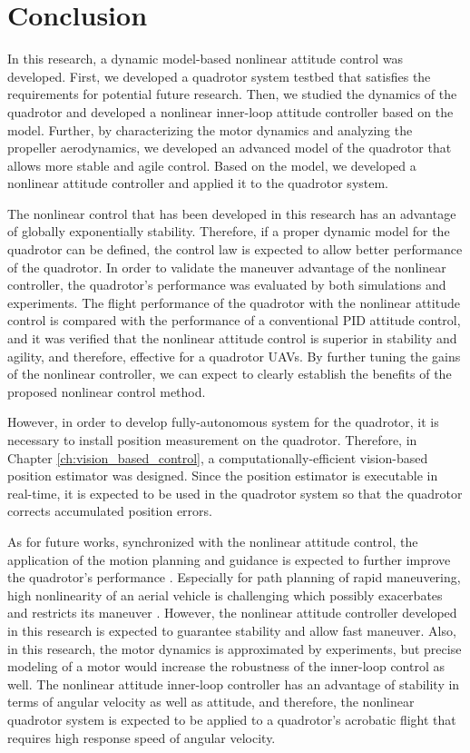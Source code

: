 \chapter{Conclusion}
\label{ch:conclusion}

In this research, a dynamic model-based nonlinear attitude control was developed. First, we developed a quadrotor system testbed that satisfies the requirements for potential future research. Then, we studied the dynamics of the quadrotor and developed a nonlinear inner-loop attitude controller based on the model. Further, by characterizing the motor dynamics and analyzing the propeller aerodynamics, we developed an advanced model of the quadrotor that allows more stable and agile control. Based on the model, we developed a nonlinear attitude controller and applied it to the quadrotor system.
 
The nonlinear control that has been developed in this research has an advantage of globally exponentially stability. Therefore, if a proper dynamic model for the quadrotor can be defined, the control law is expected to allow better performance of the quadrotor. In order to validate the maneuver advantage of the nonlinear controller, the quadrotor's performance was evaluated by both simulations and experiments. The flight performance of the quadrotor with the nonlinear attitude control is compared with the performance of a conventional PID attitude control, and it was verified that the nonlinear attitude control is superior in stability and agility, and therefore, effective for a quadrotor UAVs. By further tuning the gains of the nonlinear controller, we can expect to clearly establish the benefits of the proposed nonlinear control method.

However, in order to develop fully-autonomous system for the quadrotor, it is necessary to install position measurement on the quadrotor. Therefore, in Chapter \ref{ch:vision_based_control}, a computationally-efficient vision-based position estimator was designed. Since the position estimator is executable in real-time, it is expected to be used in the quadrotor system so that the quadrotor corrects accumulated position errors.

As for future works, synchronized with the nonlinear attitude control, the application of the motion planning and guidance is expected to further improve the quadrotor's performance \cite{motion_planning}\cite{Morgan16}\cite{Morgan14}. Especially for path planning of rapid maneuvering, high nonlinearity of an aerial vehicle is challenging which possibly exacerbates and restricts its maneuver \cite{Paranjape15}. However, the nonlinear attitude controller developed in this research is expected to guarantee stability and allow fast maneuver. Also, in this research, the motor dynamics is approximated by experiments, but precise modeling of a motor would increase the robustness of the inner-loop control as well. The nonlinear attitude inner-loop controller has an advantage of stability in terms of angular velocity as well as attitude, and therefore, the nonlinear quadrotor system is expected to be applied to a quadrotor's acrobatic flight that requires high response speed of angular velocity.